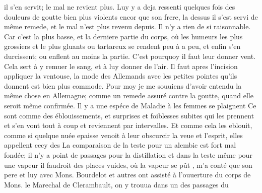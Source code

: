 il s'en servit; le mal ne revient plus. Luy y a deja ressenti quelques fois des douleurs de goutte bien plus violents encor que son frere\protect{}, la dessus il s'est servi de
m\^{e}me remede, et le mal n'est plus revenu depuis. Il n'y a rien de si raisonnable. Car c'est la plus basse, et la derniere partie du corps, o\`{u} les humeurs les plus grossiers et le plus gluants ou tartareux se rendent peu \`{a} a peu, et enfin s'en durcissent; ou enflent au moins la partie. C'est pourquoy il faut leur donner vent. Cela sert \`{a} y remuer le sang, et \`{a} luy donner de l'air. Il faut apres l'incision appliquer la ventouse, la mode
des Allemands avec les petites pointes qu'ils donnent est bien plus commode. Pour moy je me souuiens d'avoir entendu la m\^{e}me chose en Allemagne; comme un remede assur\'{e} contre la goutte, quand elle seroit m\^{e}me confirm\'{e}e.
\pend%
\pstart%
Il y a une esp\'{e}ce de Maladie \`{a}
\protect{}
les femmes se plaignent
%
Ce sont comme des \'{e}blouissements, et surprises et foiblesses subites qui les prennent et s'en vont tout \`{a} coup et reviennent par intervalles. Et comme cela les eblouit, comme si quelque nu\'{e}e epaisse venoit \`{a} leur obscurcir la veue et l'esprit, elles appellent cecy des
La comparaison de la teste pour un alembic est fort mal fond\'{e}e; il n'y a point de passages pour la distillation et dans la teste m\^{e}me pour une vapeur il faudroit des places vuides, o\`{u} la vapeur se p\^{u}t , m'a cont\'{e} que son pere\protect{} et luy avec Mons. Bourdelot\protect{} et autres ont assist\'{e} \`{a} l'ouuerture du corps de Mons. le Marechal de Clerambault\protect{}, on y trouua dans un des passages du
